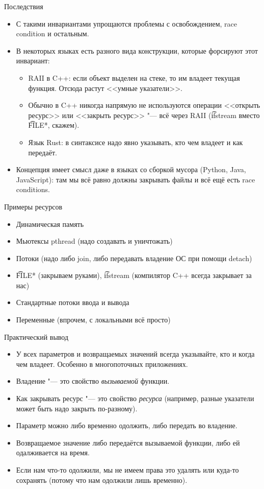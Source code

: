 \begin{frame}[t]{Последствия}
	\begin{itemize}
		\item С такими инвариантами упрощаются проблемы с освобождением, race condition и остальным.
		\item В некоторых языках есть разного вида конструкции, которые форсируют этот инвариант:
			\begin{itemize}
				\item
					RAII в C++: если объект выделен на стеке, то им владеет текущая функция.
					Отсюда растут <<умные указатели>>.
				\item
					Обычно в C++ никогда напрямую не используются операции <<открыть ресурс>>
					или <<закрыть ресурс>> "--- всё через RAII (\t{ifstream} вместо \t{FILE*}, скажем).
				\item
					Язык Rust: в синтаксисе надо явно указывать, кто чем владеет и как передаёт.
			\end{itemize} 
		\item
			Концепция имеет смысл даже в языках со сборкой мусора (Python, Java, JavaScript):
			там мы всё равно должны закрывать файлы и всё ещё есть race conditions.
	\end{itemize}
\end{frame}

\begin{frame}[t]{Примеры ресурсов}
	\begin{itemize}
		\item Динамическая память
		\item Мьютексы pthread (надо создавать и уничтожать)
		\item Потоки (надо либо join, либо передавать владение ОС при помощи detach)
		\item \t{FILE*} (закрываем руками), \t{ifstream} (компилятор C++ всегда закрывает за нас)
		\item Стандартные потоки ввода и вывода
		\item Переменные (впрочем, с локальными всё просто)
	\end{itemize}
\end{frame}

\begin{frame}[t]{Практический вывод}
	\begin{itemize}
		\item
			У всех параметров и возвращаемых значений всегда указывайте, кто и когда чем владеет.
			Особенно в многопоточных приложениях.
		\item Владение "--- это свойство \textit{вызываемой} функции.
		\item Как закрывать ресурс "--- это свойство \textit{ресурса} (например, разные указатели может быть надо закрыть по-разному).
		\item Параметр можно либо временно одолжить, либо передать во владение.
		\item Возвращаемое значение либо передаётся вызываемой функции, либо ей одалживается на время.
		\item Если нам что-то одолжили, мы не имеем права это удалять или куда-то сохранять (потому что нам одолжили лишь временно).
	\end{itemize}
\end{frame}
